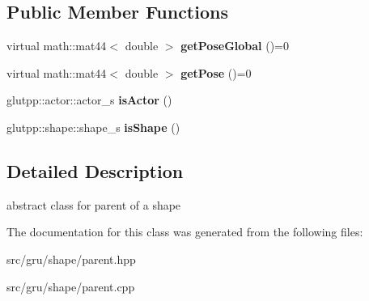 \subsection*{\-Public \-Member \-Functions}
\begin{DoxyCompactItemize}
\item 
\hypertarget{classglutpp_1_1shape_1_1parent_a75c44c5a8ec68eeca674edc733cf2175}{virtual math\-::mat44$<$ double $>$ {\bfseries get\-Pose\-Global} ()=0}\label{classglutpp_1_1shape_1_1parent_a75c44c5a8ec68eeca674edc733cf2175}

\item 
\hypertarget{classglutpp_1_1shape_1_1parent_a456b7cd7f8d8ce14eb0c5cf69981b8c7}{virtual math\-::mat44$<$ double $>$ {\bfseries get\-Pose} ()=0}\label{classglutpp_1_1shape_1_1parent_a456b7cd7f8d8ce14eb0c5cf69981b8c7}

\item 
\hypertarget{classglutpp_1_1shape_1_1parent_a62fdbb0a57fcb5febeb527c920f6823d}{glutpp\-::actor\-::actor\-\_\-s {\bfseries is\-Actor} ()}\label{classglutpp_1_1shape_1_1parent_a62fdbb0a57fcb5febeb527c920f6823d}

\item 
\hypertarget{classglutpp_1_1shape_1_1parent_a76f9ddcfe510be429b2d3374ff5a7db8}{glutpp\-::shape\-::shape\-\_\-s {\bfseries is\-Shape} ()}\label{classglutpp_1_1shape_1_1parent_a76f9ddcfe510be429b2d3374ff5a7db8}

\end{DoxyCompactItemize}


\subsection{\-Detailed \-Description}
abstract class for parent of a shape 

\-The documentation for this class was generated from the following files\-:\begin{DoxyCompactItemize}
\item 
src/gru/shape/parent.\-hpp\item 
src/gru/shape/parent.\-cpp\end{DoxyCompactItemize}

